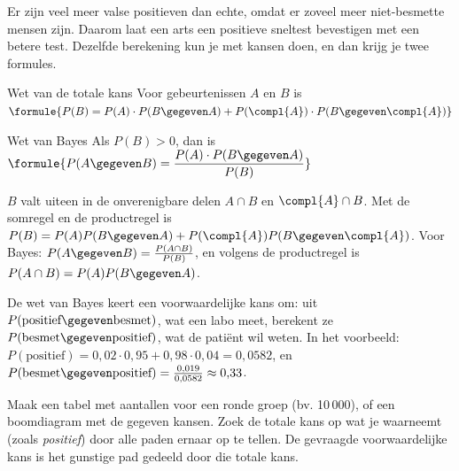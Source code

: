 Er zijn veel meer valse positieven dan echte, omdat er zoveel meer niet-besmette mensen zijn. Daarom laat een arts een positieve sneltest bevestigen met een betere test. Dezelfde berekening kun je met kansen doen, en dan krijg je twee formules.

\begin{theorie}
\begin{stelling}{Wet van de totale kans}
Voor gebeurtenissen $A$ en $B$ is \quad $\formule{P(B) = P(A) \cdot P(B \gegeven A) + P(\compl{A}) \cdot P(B \gegeven \compl{A})}$
\end{stelling}

\begin{stelling}{Wet van Bayes}
Als $P(B) > 0$, dan is \quad $\formule{P(A \gegeven B) = \dfrac{P(A) \cdot P(B \gegeven A)}{P(B)}}$
\end{stelling}

\begin{bewijs}
$B$ valt uiteen in de onverenigbare delen $A \cap B$ en $\compl{A} \cap B$. Met de somregel en de productregel is $P(B) = P(A)P(B \gegeven A) + P(\compl{A})P(B \gegeven \compl{A})$. Voor Bayes: $P(A \gegeven B) = \frac{P(A \cap B)}{P(B)}$, en volgens de productregel is $P(A \cap B) = P(A)P(B \gegeven A)$.
\end{bewijs}
\end{theorie}

De wet van Bayes keert een voorwaardelijke kans om: uit $P(\text{positief} \gegeven \text{besmet})$, wat een labo meet, berekent ze $P(\text{besmet} \gegeven \text{positief})$, wat de patiënt wil weten. In het voorbeeld: $P(\text{positief}) = 0{,}02 \cdot 0{,}95 + 0{,}98 \cdot 0{,}04 = 0{,}0582$, en $P(\text{besmet} \gegeven \text{positief}) = \frac{0{,}019}{0{,}0582} \approx 0{,}33$.

\begin{werkwijze}
Maak een tabel met aantallen voor een ronde groep (bv. 10\,000), of een boomdiagram met de gegeven kansen. Zoek de totale kans op wat je waarneemt (zoals \textit{positief}) door alle paden ernaar op te tellen. De gevraagde voorwaardelijke kans is het gunstige pad gedeeld door die totale kans.
\end{werkwijze}

\begin{oefeningen}

\end{oefeningen}

\opdrachtenkop

